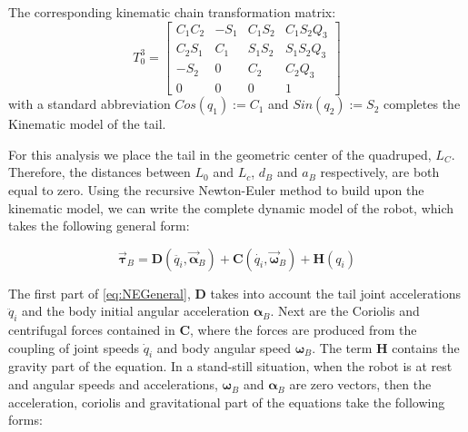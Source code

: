 The corresponding kinematic chain transformation matrix:
\begin{equation}
T_0^3=\begin{bmatrix}
C_1 C_2 & -S_1 & C_1 S_2 & C_1 S_2 Q_3 \\
C_2 S_1 & C_1 & S_1 S_2 & S_1 S_2 Q_3 \\
-S_2 & 0 & C_2 & C_2 Q_3 \\
 0 & 0 & 0 & 1
\end{bmatrix}
\end{equation}
with a standard abbreviation $Cos(q_1):=C_1$ and $Sin(q_2):=S_2$ completes the Kinematic model of the tail. 

For this analysis we place the tail in the geometric center of the quadruped, $L_C$. Therefore, the distances between $L_0$ and $L_c$, $d_B$ and $a_B$ respectively, are both equal to zero. Using the recursive Newton-Euler method to build upon the kinematic model, we can write the complete dynamic model of the robot, which takes the following general form:

\begin{equation}\label{eq:NEGeneral}
\vec{\boldsymbol{\tau}}_B=\mathbf{D}\left ( \ddot{q_i},\vec{\boldsymbol{\alpha}}_B \right )+\mathbf{C}\left ( \dot{q_i},\vec{\boldsymbol{\omega}}_B \right )+\mathbf{H}\left ( {q_i} \right )
\end{equation}

The first part of \eqref{eq:NEGeneral}, $\mathbf{D}$ takes into account the tail joint accelerations $\ddot{q}_i$ and the body initial angular acceleration $\boldsymbol{\alpha}_B$. Next are the Coriolis and centrifugal forces contained in $\mathbf{C}$, where the forces are produced from the coupling of joint speeds $\dot{q}_i$ and body angular speed $\boldsymbol{\omega}_B$. The term $\mathbf{H}$ contains the gravity part of the equation. In a stand-still situation, when the robot is at rest and angular speeds and accelerations,  $\boldsymbol{\omega}_B$ and  $\boldsymbol{\alpha}_B$ are zero vectors, then the acceleration, coriolis and gravitational part of the equations take the following forms:
 
